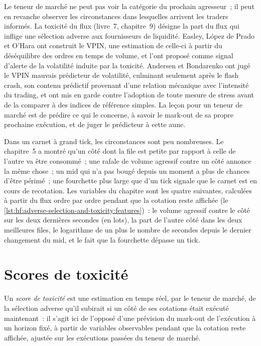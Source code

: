 Le teneur de marché ne peut pas voir la catégorie du prochain agresseur~; il peut en revanche observer les circonstances dans lesquelles arrivent les traders informés. La toxicité du flux
(livre~7, chapitre~9) désigne la part du flux qui inflige une sélection adverse aux fournisseurs de liquidité. Easley, López de Prado et O'Hara ont construit le
VPIN, une estimation de celle-ci à partir du déséquilibre des ordres en temps de volume, et l'ont proposé comme signal d'alerte de la volatilité induite par la toxicité. Andersen et Bondarenko
ont jugé le VPIN mauvais prédicteur de volatilité, culminant seulement après le flash crash, son contenu prédictif provenant d'une relation mécanique avec
l'intensité du trading, et ont mis en garde contre l'adoption de toute mesure de stress avant de la comparer à des indices de référence simples. La leçon pour un teneur de marché est de
prédire ce qui le concerne, à savoir le mark-out de sa propre prochaine exécution, et de juger le prédicteur à cette aune.

Dans un carnet à grand tick, les circonstances sont peu nombreuses. Le chapitre~5 a montré qu'un côté dont la file est petite par rapport à celle de l'autre va être consommé~; une
rafale de volume agressif contre un côté annonce la même chose~; un mid qui n'a pas bougé depuis un moment a plus de chances d'être périmé~; une fourchette plus large
que d'un tick signale que le carnet est en cours de recotation. Les variables du chapitre sont les quatre suivantes, calculées à partir du flux ordre par ordre pendant que la cotation reste affichée
(le \cref{lst:hf:adverse-selection-and-toxicity:features})~: le volume agressif contre le côté sur les deux dernières secondes (en lots), la part de l'autre
côté dans les deux meilleures files, le logarithme de un plus le nombre de secondes depuis le dernier changement du mid, et le fait que la fourchette dépasse un tick.

\section{Scores de toxicité}

\begin{definition}\label{def:hf:adverse-selection-and-toxicity:score}
Un \emph{score de toxicité} est une estimation en temps réel, par le teneur de marché, de la sélection adverse qu'il subirait si un côté de ses
cotations était exécuté maintenant~: il s'agit ici de l'opposé d'une prévision du mark-out de l'exécution à un horizon fixé, à partir de variables observables pendant que la cotation reste affichée,
ajustée sur les exécutions passées du teneur de marché.
\end{definition}

